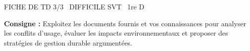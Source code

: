 \documentclass[11pt]{article}
\begin{document}
\begin{tcolorbox}[enhanced,colback=popink,colframe=popink,arc=10pt,boxrule=0pt,left=12pt,right=12pt,top=9pt,bottom=9pt]
{\color{white}\popxbold\small FICHE DE TD 3/3 \textbullet\ DIFFICILE \hfill SVT \textbullet\ 1re D\par}
\end{tcolorbox}
\vspace{4pt}
\noindent\textbf{Consigne :} Exploitez les documents fournis et vos connaissances pour analyser les conflits d'usage, évaluer les impacts environnementaux et proposer des stratégies de gestion durable argumentées.
\end{document}
